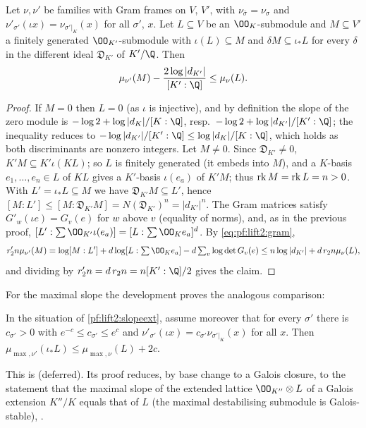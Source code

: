 \begin{lemma}\label{pf:lift2:slopediff}
Let $\nu,\nu'$ be families with Gram frames on $V$, $V'$, with $\nu_{\bar\sigma}=\nu_\sigma$ and
$\nu'_{\sigma'}(\iota x)=\nu_{\sigma'|_K}(x)$ for all $\sigma'$, $x$. Let $L\subseteq V$ be an
$\OO_K$-submodule and $M\subseteq V'$ a finitely generated $\OO_{K'}$-submodule with $\iota(L)\subseteq M$ and
$\delta M\subseteq\iota_*L$ for every $\delta$ in the different ideal $\mathfrak D_{K'}$ of $K'/\Q$. Then
\[
\mu_{\nu'}(M)-\frac{2\log|d_{K'}|}{[K':\Q]}\le\mu_\nu(L).
\]
\end{lemma}

\begin{proof}
If $M=0$ then $L=0$ (as $\iota$ is injective), and by definition the slope of the zero module is
$-\log2+\log|d_K|/[K:\Q]$, resp.\ $-\log2+\log|d_{K'}|/[K':\Q]$; the inequality reduces to
$-\log|d_{K'}|/[K':\Q]\le\log|d_K|/[K:\Q]$, which holds as both discriminants are nonzero integers. Let
$M\ne0$. Since
$\mathfrak D_{K'}\ne0$, $K'M\subseteq K'\iota(KL)$; so $L$ is finitely generated (it embeds into $M$), and a
$K$-basis $e_1,\dots,e_n\in L$ of $KL$ gives a $K'$-basis $\iota(e_a)$ of $K'M$; thus $\operatorname{rk}
M=\operatorname{rk} L=n>0$. With $L'=\iota_*L\subseteq M$ we have $\mathfrak D_{K'}M\subseteq L'$, hence
$[M:L']\le[M:\mathfrak D_{K'}M]=N(\mathfrak D_{K'})^n=|d_{K'}|^n$. The Gram matrices satisfy $G'_w(\iota
e)=G_v(e)$ for $w$ above $v$ (equality of norms), and, as in the previous proof,
$[L':\sum\OO_{K'}\iota(e_a)]=[L:\sum\OO_Ke_a]^d$. By \eqref{eq:pf:lift2:gram},
\[
r_2'n\mu_{\nu'}(M)=\log[M:L']+d\log[L:\textstyle\sum\OO_Ke_a]-d\sum_v\log\det G_v(e)\le n\log|d_{K'}|+d\,r_2n\mu_\nu(L),
\]
and dividing by $r_2'n=d\,r_2n=n[K':\Q]/2$ gives the claim.
\end{proof}

For the maximal slope the development proves the analogous comparison:

\begin{lemma}\label{pf:lift2:slopemaxext}
In the situation of \cref{pf:lift2:slopeext}, assume moreover that for every $\sigma'$ there is $c_{\sigma'}>0$
with $e^{-c}\le c_{\sigma'}\le e^{c}$ and $\nu'_{\sigma'}(\iota x)=c_{\sigma'}\nu_{\sigma'|_K}(x)$ for all $x$. Then
$\mu_{\max,\nu'}(\iota_*L)\le\mu_{\max,\nu}(L)+2c$.
\end{lemma}

This is  (deferred). Its
proof reduces, by base change to a Galois closure, to the statement that the maximal slope of the extended
lattice $\OO_{K''}\otimes L$ of a Galois extension $K''/K$ equals that of $L$ (the maximal destabilising
submodule is Galois-stable), .

